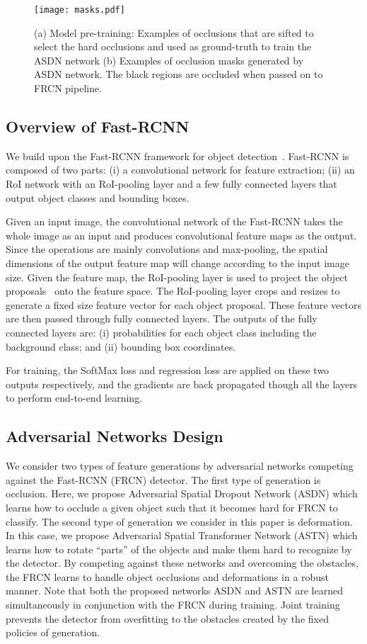 \documentclass[10pt,twocolumn,letterpaper]{article}
\begin{document}
\begin{figure*}
    \centering
    \texttt{[image: masks.pdf]}
    \caption{(a) Model pre-training: Examples of occlusions that are sifted to select the hard occlusions and used as ground-truth to train the ASDN network  (b) Examples of occlusion masks generated by ASDN network. The black regions are occluded when passed on to FRCN pipeline. }\label{fig:ASDN}
\end{figure*}

\subsection{Overview of Fast-RCNN}
We build upon the Fast-RCNN framework for object detection~\cite{frcn}. Fast-RCNN is composed of two parts: (i) a convolutional network for feature extraction; (ii) an RoI network with an  RoI-pooling layer and a few fully connected layers that output object classes and bounding boxes. 

Given an input image, the convolutional network of the Fast-RCNN takes the whole image as an input and produces convolutional feature maps as the output. Since the operations are mainly convolutions and max-pooling, the spatial dimensions of the output feature map will change according to the input image size. Given the feature map, the RoI-pooling layer is used to project the object proposals~\cite{Uijlings13} onto the feature space. The RoI-pooling layer crops and resizes to generate a fixed size feature vector for each object proposal. These feature vectors are then passed through fully connected layers. The outputs of the fully connected layers are: (i) probabilities for each object class including the background class; and (ii) bounding box coordinates. 

For training, the SoftMax loss and regression loss are applied on these two outputs respectively, and the gradients are back propagated  though all the layers to perform end-to-end learning.

\subsection{Adversarial Networks Design}
We consider two types of feature generations by adversarial networks competing against the Fast-RCNN (FRCN) detector. The first type of generation is occlusion. Here, we propose Adversarial Spatial Dropout Network (ASDN) which learns how to occlude a given object such that it becomes hard for FRCN to classify. The second type of generation we consider in this paper is deformation. In this case, we propose Adversarial Spatial Transformer Network (ASTN) which learns how to rotate ``parts'' of the objects and make them hard to recognize by the detector. By competing against these networks and overcoming the obstacles, the FRCN learns  to handle object occlusions and deformations in a robust manner. Note that both the proposed networks ASDN and ASTN are learned simultaneously in conjunction with the FRCN during training. Joint training prevents the detector from overfitting to the obstacles created by the fixed policies of generation. 
\end{document}
